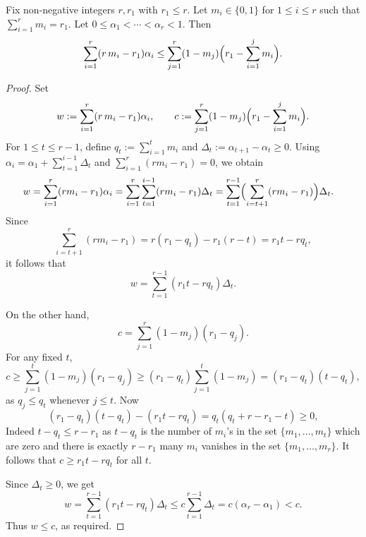 \documentclass[10pt,a4paper]{amsart}
\begin{document}
\begin{lemma}\label{key_lemma}
Fix non-negative integers $r,r_1$ with $r_1 \leq r$. Let $m_i \in \{0,1\}$ for $1 \leq i \leq r$ such that $\sum\limits_{i=1}^r m_i=r_1$. Let $0\le \alpha_1<\cdots<\alpha_r<1$. Then
\[
\sum\limits_{i=1}^r (r\,m_i-r_1)\alpha_i
\leq
\sum_{j=1}^{r}(1-m_j)\Bigl(r_1-\sum_{i=1}^{j}m_i\Bigr).
\]
\end{lemma}

\begin{proof}
Set
\[
w:=\sum_{i=1}^r (r\,m_i-r_1)\alpha_i, \qquad
c:=\sum_{j=1}^{r}(1-m_j)\Bigl(r_1-\sum_{i=1}^{j}m_i\Bigr).
\]
For $1\le t\le r-1$, define $q_t:=\sum\limits_{i=1}^t m_i$ and $\Delta_t:=\alpha_{t+1}-\alpha_t\ge 0$.
Using $\alpha_i=\alpha_1+\sum\limits_{t=1}^{i-1}\Delta_t$ and $\sum\limits_{i=1}^r(rm_i-r_1)=0$, we obtain
\begin{align*}
w
&= \sum_{i=1}^r (rm_i-r_1)\alpha_i
= \sum_{i=1}^r \sum_{t=1}^{i-1} (rm_i-r_1)\Delta_t
= \sum_{t=1}^{r-1}\Bigl(\sum_{i=t+1}^r (rm_i-r_1)\Bigr)\Delta_t.
\end{align*}
Since
\[
\sum_{i=t+1}^r (rm_i-r_1)=r(r_1-q_t)-r_1(r-t)=r_1 t-r q_t,
\]
it follows that
\[
w=\sum_{t=1}^{r-1}(r_1 t-r q_t)\Delta_t.
\]

On the other hand,
\[
c=\sum_{j=1}^r (1-m_j)(r_1-q_j).
\]
For any fixed $t$,
\[
c \ge \sum_{j=1}^t (1-m_j)(r_1-q_j)
\ge (r_1-q_t)\sum_{j=1}^t (1-m_j)
= (r_1-q_t)(t-q_t),
\]
as $q_j\le q_t$ whenever $j\le t$. Now
\[
(r_1-q_t)(t-q_t)-(r_1 t-r q_t)=q_t(q_t+r-r_1-t)\ge 0,
\]
Indeed $t-q_t\le r-r_1$ as $t-q_t$ is the number of $m_i$'s in the set $\{ m_1, \ldots , m_t\}$ which are zero and there is exactly $r-r_1$ many $m_i$ vanishes in the set $\{ m_1, \ldots , m_r\}$. It follows that $c\ge r_1 t-r q_t$ for all $t$.

Since $\Delta_t\ge 0$, we get
\[
w=\sum_{t=1}^{r-1}(r_1 t-r q_t)\Delta_t
\le c\sum_{t=1}^{r-1}\Delta_t
= c(\alpha_r-\alpha_1) < c.
\]
Thus $w\le c$, as required.
\end{proof}
\end{document}
